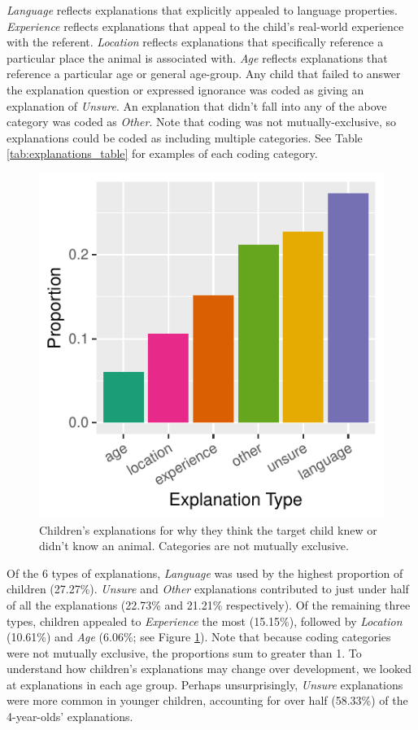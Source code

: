 \documentclass[10pt, letterpaper]{article}
\newenvironment{CodeChunk}{}{}
\begin{document}
\emph{Language} reflects explanations that explicitly appealed to
language properties. \emph{Experience} reflects explanations that appeal
to the child's real-world experience with the referent. \emph{Location}
reflects explanations that specifically reference a particular place the
animal is associated with. \emph{Age} reflects explanations that
reference a particular age or general age-group. Any child that failed
to answer the explanation question or expressed ignorance was coded as
giving an explanation of \emph{Unsure}. An explanation that didn't fall
into any of the above category was coded as \emph{Other}. Note that
coding was not mutually-exclusive, so explanations could be coded as
including multiple categories. See Table \ref{tab:explanations_table}
for examples of each coding category.

\begin{CodeChunk}
\begin{figure}[tb]
\includegraphics{figs/explanations-1} \caption[Children's explanations for why they think the target child knew or didn't know an animal]{Children's explanations for why they think the target child knew or didn't know an animal. Categories are not mutually exclusive.}\label{fig:explanations}
\end{figure}
\end{CodeChunk}

Of the 6 types of explanations, \emph{Language} was used by the highest
proportion of children (27.27\%). \emph{Unsure} and \emph{Other}
explanations contributed to just under half of all the explanations
(22.73\% and 21.21\% respectively). Of the remaining three types,
children appealed to \emph{Experience} the most (15.15\%), followed by
\emph{Location} (10.61\%) and \emph{Age} (6.06\%; see Figure
\ref{fig:explanations}). Note that because coding categories were not
mutually exclusive, the proportions sum to greater than 1. To understand
how children's explanations may change over development, we looked at
explanations in each age group. Perhaps unsurprisingly, \emph{Unsure}
explanations were more common in younger children, accounting for over
half (58.33\%) of the 4-year-olds' explanations.
\end{document}
